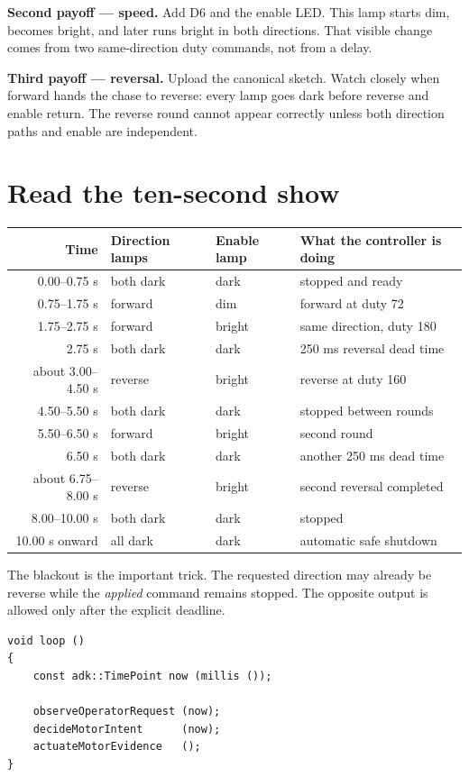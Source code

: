 \documentclass[11pt]{article}
\begin{document}
\textbf{Second payoff --- speed.} Add D6 and the enable LED. This lamp starts
dim, becomes bright, and later runs bright in both directions. That visible
change comes from two same-direction duty commands, not from a delay.

\textbf{Third payoff --- reversal.} Upload the canonical sketch. Watch closely
when forward hands the chase to reverse: every lamp goes dark before reverse
and enable return. The reverse round cannot appear correctly unless both
direction paths and enable are independent.

\newpage
\section{Read the ten-second show}

\begin{tabularx}{\linewidth}{@{}r l l X@{}}
\toprule
Time & Direction lamps & Enable lamp & What the controller is doing\\
\midrule
0.00--0.75 s & both dark & dark & stopped and ready\\
0.75--1.75 s & forward & dim & forward at duty 72\\
1.75--2.75 s & forward & bright & same direction, duty 180\\
2.75 s & both dark & dark & 250 ms reversal dead time\\
about 3.00--4.50 s & reverse & bright & reverse at duty 160\\
4.50--5.50 s & both dark & dark & stopped between rounds\\
5.50--6.50 s & forward & bright & second round\\
6.50 s & both dark & dark & another 250 ms dead time\\
about 6.75--8.00 s & reverse & bright & second reversal completed\\
8.00--10.00 s & both dark & dark & stopped\\
10.00 s onward & all dark & dark & automatic safe shutdown\\
\bottomrule
\end{tabularx}

The blackout is the important trick. The requested direction may already be
reverse while the \emph{applied} command remains stopped. The opposite output
is allowed only after the explicit deadline.

\begin{lstlisting}[style=adkcpp]
void loop ()
{
    const adk::TimePoint now (millis ());

    observeOperatorRequest (now);
    decideMotorIntent      (now);
    actuateMotorEvidence   ();
}
\end{lstlisting}
\end{document}
